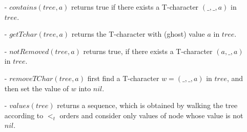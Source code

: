 \begin{itemize}
\setlength{\itemsep}{0.5pt}
\item[-] $contains(tree,a)$ returns true if there exists a T-character $(\_,\_,a)$ in $tree$.

\item[-] $getTchar(tree,a)$ returns the T-character with (ghost) value $a$ in $tree$.

\item[-] $notRemoved(tree,a)$ returns true, if there exists a T-character $(a,\_,a)$ in $tree$.

\item[-] $removeTChar(tree,a)$ first find a T-character $w=(\_,\_,a)$ in $tree$, and then set the value of $w$ into $nil$.

\item[-] $values(tree)$ returns a sequence, which is obtained by walking the tree according to $<_t$ orders and consider only values of node whose value is not $nil$.
\end{itemize}





